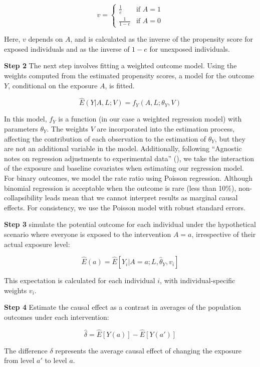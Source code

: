 \documentclass[
  singlecolumn]{article}
\begin{document}
\[
v = 
\begin{cases} 
\frac{1}{e} & \text{if } A = 1 \\
\frac{1}{1-e} & \text{if } A = 0 
\end{cases}
\]

Here, \(v\) depends on \(A\), and is calculated as the inverse of the
propensity score for exposed individuals and as the inverse of \(1-e\)
for unexposed individuals.

\textbf{Step 2} The next step involves fitting a weighted outcome model.
Using the weights computed from the estimated propensity scores, a model
for the outcome \(Y\), conditional on the exposure \(A\), is fitted.

\[ \hat{E}(Y|A, L; V) = f_Y(A, L ; \theta_Y, V) \]

In this model, \(f_Y\) is a function (in our case a weighted regression
model) with parameters \(θ_Y\). The weights \(V\) are incorporated into
the estimation process, affecting the contribution of each observation
to the estimation of \(θ_Y\), but they are not an additional variable in
the model. Additionally, following {``Agnostic notes on regression
adjustments to experimental data''} (), we
take the interaction of the exposure and baseline covariates when
estimating our regression model. For binary outcomes, we model the rate
ratio using Poisson regression. Although binomial regression is
acceptable when the outcome is rare (less than 10\%), non-collapsibility
leads mean that we cannot interpret results as marginal causal effects.
For consistency, we use the Poisson model with robust standard errors.

\textbf{Step 3} simulate the potential outcome for each individual under
the hypothetical scenario where everyone is exposed to the intervention
\(A=a\), irrespective of their actual exposure level:

\[\hat{E}(a) = \hat{E}[Y_i|A=a; L,\hat{\theta}_Y, v_i]\]

This expectation is calculated for each individual \(i\), with
individual-specific weights \(v_i\).

\textbf{Step 4} Estimate the causal effect as a contrast in averages of
the population outcomes under each intervention:

\[\hat{\delta} = \hat{E}[Y(a)] - \hat{E}[Y(a')]\]

The difference \(\delta\) represents the average causal effect of
changing the exposure from level \(a'\) to level \(a\).
\end{document}
